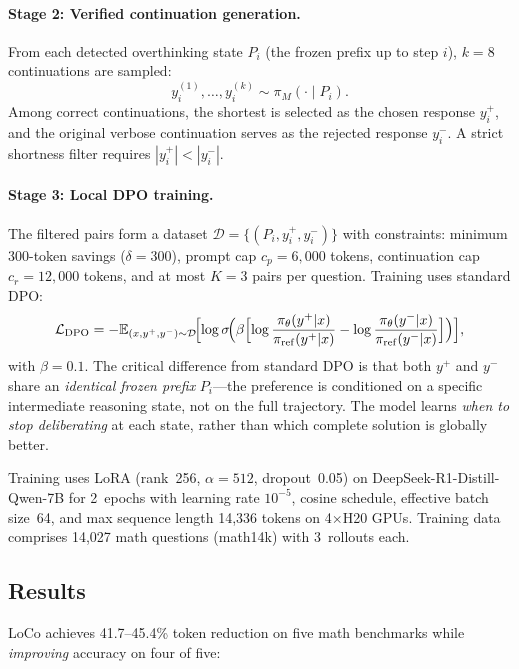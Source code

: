\documentclass[11pt,a4paper]{article}
\begin{document}
\paragraph{Stage 2: Verified continuation generation.}
From each detected overthinking state $P_i$ (the frozen prefix up to step $i$), $k{=}8$ continuations are sampled:
\begin{equation}
  y_i^{(1)}, \ldots, y_i^{(k)} \sim \pi_M(\cdot \mid P_i).
\end{equation}
Among correct continuations, the shortest is selected as the chosen response $y_i^+$, and the original verbose continuation serves as the rejected response $y_i^-$. A strict shortness filter requires $|y_i^+| < |y_i^-|$.

\paragraph{Stage 3: Local DPO training.}
The filtered pairs form a dataset $\mathcal{D} = \{(P_i, y_i^+, y_i^-)\}$ with constraints: minimum 300-token savings ($\delta{=}300$), prompt cap $c_p{=}6{,}000$ tokens, continuation cap $c_r{=}12{,}000$ tokens, and at most $K{=}3$ pairs per question. Training uses standard DPO:
\begin{equation}
  \mathcal{L}_{\mathrm{DPO}} = -\mathbb{E}_{(x,y^+,y^-) \sim \mathcal{D}}\!\Bigl[\log \sigma\!\Bigl(\beta\Bigl[\log\frac{\pi_\theta(y^+|x)}{\pi_{\mathrm{ref}}(y^+|x)} - \log\frac{\pi_\theta(y^-|x)}{\pi_{\mathrm{ref}}(y^-|x)}\Bigr]\Bigr)\Bigr],
\end{equation}
with $\beta{=}0.1$. The critical difference from standard DPO is that both $y^+$ and $y^-$ share an \emph{identical frozen prefix} $P_i$---the preference is conditioned on a specific intermediate reasoning state, not on the full trajectory. The model learns \emph{when to stop deliberating} at each state, rather than which complete solution is globally better.

Training uses LoRA (rank~256, $\alpha{=}512$, dropout~0.05) on DeepSeek-R1-Distill-Qwen-7B for 2~epochs with learning rate $10^{-5}$, cosine schedule, effective batch size~64, and max sequence length 14{,}336 tokens on 4$\times$H20 GPUs. Training data comprises 14{,}027 math questions (math14k) with 3~rollouts each.

\subsection{Results}
LoCo achieves 41.7--45.4\% token reduction on five math benchmarks while \emph{improving} accuracy on four of five:
\end{document}

